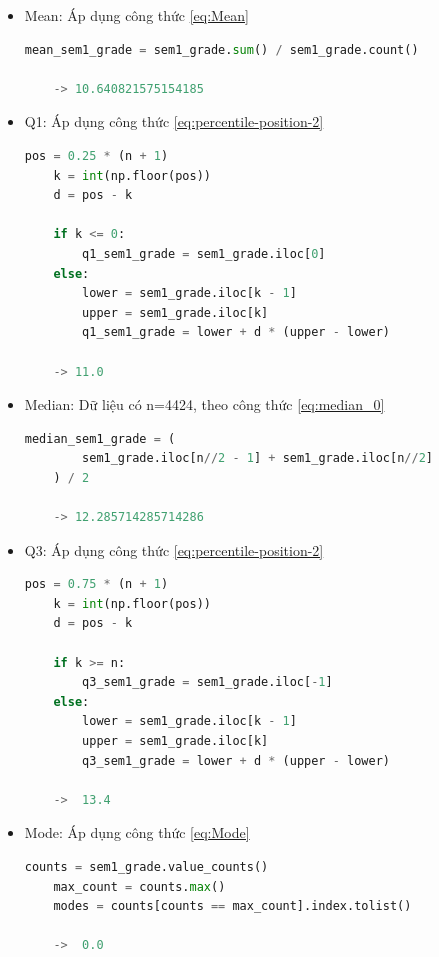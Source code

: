     \begin{itemize}
        \item Mean:
            Áp dụng công thức \ref{eq:Mean}

\begin{lstlisting}[language=Python]
    mean_sem1_grade = sem1_grade.sum() / sem1_grade.count()
    
    -> 10.640821575154185
\end{lstlisting}

        \item Q1: Áp dụng công thức \ref{eq:percentile-position-2}
\begin{lstlisting}[language=Python]
    pos = 0.25 * (n + 1)
    k = int(np.floor(pos))
    d = pos - k
    
    if k <= 0:
        q1_sem1_grade = sem1_grade.iloc[0]
    else:
        lower = sem1_grade.iloc[k - 1]
        upper = sem1_grade.iloc[k]
        q1_sem1_grade = lower + d * (upper - lower)
    
    -> 11.0
\end{lstlisting}

        \item Median: Dữ liệu có n=4424, theo công thức \ref{eq:median_0}
\begin{lstlisting}[language=Python]
    median_sem1_grade = (
        sem1_grade.iloc[n//2 - 1] + sem1_grade.iloc[n//2]
    ) / 2
    
    -> 12.285714285714286
\end{lstlisting}
            
        \item Q3: Áp dụng công thức \ref{eq:percentile-position-2}
\begin{lstlisting}[language=Python]
    pos = 0.75 * (n + 1)
    k = int(np.floor(pos))
    d = pos - k
    
    if k >= n:
        q3_sem1_grade = sem1_grade.iloc[-1]
    else:
        lower = sem1_grade.iloc[k - 1]
        upper = sem1_grade.iloc[k]
        q3_sem1_grade = lower + d * (upper - lower)

    ->  13.4
\end{lstlisting}

        \item Mode: Áp dụng công thức \ref{eq:Mode}
\begin{lstlisting}[language=Python]
    counts = sem1_grade.value_counts()
    max_count = counts.max()
    modes = counts[counts == max_count].index.tolist()

    ->  0.0
\end{lstlisting}


\end{itemize}
